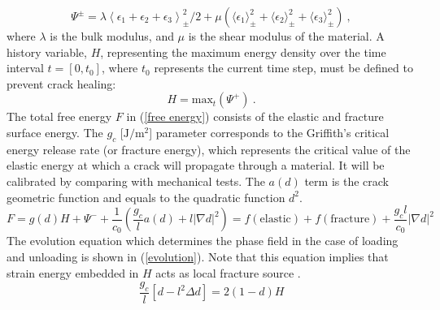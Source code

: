 \documentclass[11pt,a4paper]{article}
\begin{document}
\begin{equation}
\Psi^\pm = \lambda\left\langle \epsilon_1 + \epsilon_2 + \epsilon_3 \right\rangle_\pm^2/2 + \mu\left( \langle \epsilon_1 \rangle_\pm^2 + \langle \epsilon_2 \rangle_\pm^2 + \langle \epsilon_3 \rangle_\pm^2 \right) \ ,
\label{Psi_plus_minus}
\end{equation}
where $\lambda$ is the bulk modulus, and $\mu$ is the shear modulus of the material.
A history variable, $H$, representing the maximum energy density over the time interval $t=[0,t_0]$, where $t_0$ represents the current time step, must be defined to prevent crack healing:
\begin{equation}
H=\textrm{max}_t(\Psi^+ ) \ .
\label{History}
\end{equation}
The total free energy $F$ in (\ref{free energy}) consists of the elastic and fracture surface energy. The $g_c$ [$\textrm{J}/\textrm{m}^\textrm{2}$] parameter corresponds to the Griffith’s critical energy release rate (or fracture energy), which represents the critical value of the elastic energy at which a crack will propagate through a material. It will be calibrated by comparing with mechanical tests. The $a(d)$ term is the crack geometric function and equals to the quadratic function $d^2$.
\begin{equation}
F=g(d)H+\Psi^-+\frac{1}{c_0}(\frac{g_c}{l}a(d)+l|∇d|^2)=f(\textrm{elastic})+ f(\textrm{fracture})+\frac{g_c l}{c_0}|∇d|^2 
\label{free energy}
\end{equation}
The evolution equation which determines the phase field in the case of loading and unloading is shown in (\ref{evolution}). Note that this equation implies that strain energy embedded in $H$ acts as local fracture source \cite{miehe2010phase}.
\begin{equation}
\frac{g_c}{l}[d-l^2\Delta d] = 2(1-d)H
\label{evolution}
\end{equation}
\end{document}
